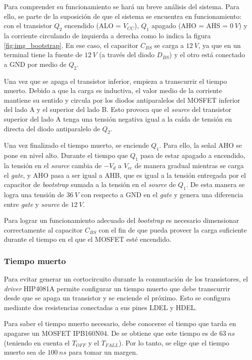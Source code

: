 Para comprender su funcionamiento se hará un breve análisis del sistema. Para ello, se parte de la suposición de que el sistema se encuentra en funcionamiento: con el transistor $Q_2$ encendido (ALO = $V_{CC}$), $Q_1$ apagado (AHO = AHS = $0\:V$) y la corriente circulando de izquierda a derecha como lo indica la figura \ref{fig:img_bootstrap}. En ese caso, el capacitor $C_{BS}$ se carga a $12\:V$, ya que en un terminal tiene la fuente de $12\:V$ (a través del diodo $D_{BS}$) y el otro está conectado a GND por medio de $Q_2$.

Una vez que se apaga el transistor inferior, empieza a transcurrir el tiempo muerto. Debido a que la carga es inductiva, el valor medio de la corriente mantiene su sentido y circula por los diodos antiparalelos del MOSFET inferior del lado A y el superior del lado B. Esto provoca que el \textsl{source} del transistor superior del lado A tenga una tensión negativa igual a la caída de tensión en directa del diodo antiparalelo de $Q_2$. 

Una vez finalizado el tiempo muerto, se enciende $Q_1$. Para ello, la señal AHO se pone en nivel alto. Durante el tiempo que $Q_1$ pasa de estar apagado a encendido, la tensión en el \textsl{source} cambia de $-V_d$ a $V_{cc}$ de manera gradual mientras se carga el \textsl{gate}, y AHO pasa a ser igual a AHB, que es igual a la tensión entregada por el capacitor de \textsl{bootstrap} sumada a la tensión en el \textsl{source} de $Q_1$. De esta manera se logra una tensión de $36\:V$ con respecto a GND en el \textsl{gate} y genera una diferencia entre \textsl{gate} y \textsl{source} de $12\:V$.

Para lograr un funcionamiento adecuado del \textsl{bootstrap} es necesario dimensionar correctamente al capacitor $C_{BS}$ con el fin de que pueda proveer la carga suficiente durante el tiempo en el que el MOSFET esté encendido.

\subsubsection{Tiempo muerto}

\noindent Para evitar generar un cortocircuito durante la conmutación de los transistores, el \textsl{driver} HIP4081A permite configurar un tiempo muerto que debe transcurrir desde que se apaga un transistor y se enciende el próximo. Esto se configura mediante dos resistencias conectadas a sus pines LDEL y HDEL.

\noindent Para saber el tiempo muerto necesario, debe conocerse el tiempo que tarda en apagarse un MOSFET IPB160N04. De \cite{IPB160N04} se obtiene que este tiempo es de $63\:ns$ (teniendo en cuenta el $T_{OFF}$ y el $T_{FALL}$). Por lo tanto, se elige que el tiempo muerto sea de $100\:ns$ para tomar un margen.

